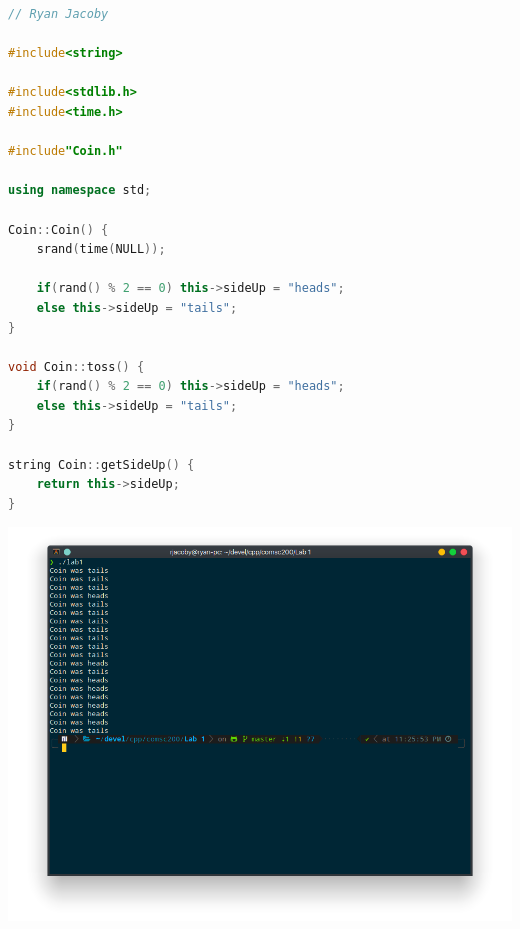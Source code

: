 \documentclass[letterpaper, 11pt]{article}
\begin{document}
\begin{lstlisting}[language=C++, caption=CoinImp.cpp]
// Ryan Jacoby

#include<string>

#include<stdlib.h>
#include<time.h>

#include"Coin.h"

using namespace std;

Coin::Coin() {
    srand(time(NULL));

    if(rand() % 2 == 0) this->sideUp = "heads";
    else this->sideUp = "tails";
}

void Coin::toss() {
    if(rand() % 2 == 0) this->sideUp = "heads";
    else this->sideUp = "tails";
}

string Coin::getSideUp() {
    return this->sideUp;
}
\end{lstlisting}

\includegraphics[scale=0.5]{coin_run.png} 
\end{document}
